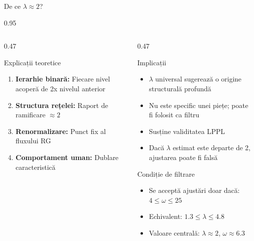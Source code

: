 \documentclass[9pt, aspectratio=169, t]{beamer}
\begin{document}
\begin{frame}{De ce $\lambda \approx 2$?}
\begin{cminipage}{0.95\textwidth}
{\begin{columns}[T]
\begin{column}{0.47\textwidth}
            \begin{exampleblock}{Explicații teoretice}
                \begin{enumerate}\setlength{\itemsep}{1pt}
                    \item \textbf{Ierarhie binară:} Fiecare nivel acoperă de 2x nivelul anterior
                    \item \textbf{Structura rețelei:} Raport de ramificare $\approx 2$
                    \item \textbf{Renormalizare:} Punct fix al fluxului RG
                    \item \textbf{Comportament uman:} Dublare caracteristică
                \end{enumerate}
            \end{exampleblock}
        \end{column}
        \begin{column}{0.47\textwidth}
            \begin{alertblock}{Implicații}
                \begin{itemize}\setlength{\itemsep}{0pt}
                    \item $\lambda$ universal sugerează o origine structurală profundă
                    \item Nu este specific unei piețe; poate fi folosit ca filtru
                    \item Susține validitatea LPPL
                    \item Dacă $\lambda$ estimat este departe de 2, ajustarea poate fi falsă
                \end{itemize}
            \end{alertblock}

            \begin{block}{Condiție de filtrare}
                \begin{itemize}\setlength{\itemsep}{0pt}
                    \item Se acceptă ajustări doar dacă: $4 \leq \omega \leq 25$
                    \item Echivalent: $1.3 \leq \lambda \leq 4.8$
                    \item Valoare centrală: $\lambda \approx 2$, $\omega \approx 6.3$
                \end{itemize}
            \end{block}
        \end{column}
    \end{columns}
    }
    \end{cminipage}
\end{frame}
\end{document}

